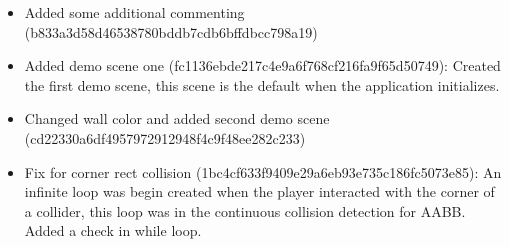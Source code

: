 \documentclass{article}
\begin{document}
\begin{itemize}
    \item Added some additional commenting (b833a3d58d46538780bddb7cdb6bffdbcc798a19)

    \item Added demo scene one (fc1136ebde217c4e9a6f768cf216fa9f65d50749): Created the first demo scene, this scene is the default when the application initializes.

    \item Changed wall color and added second demo scene \\ (cd22330a6df4957972912948f4c9f48ee282c233)

    \item Fix for corner rect collision (1bc4cf633f9409e29a6eb93e735c186fc5073e85): An infinite loop was begin created when the player interacted with the corner of a collider, this loop was in the continuous collision detection for AABB. Added a check in while loop.

\end{itemize}
\end{document}
